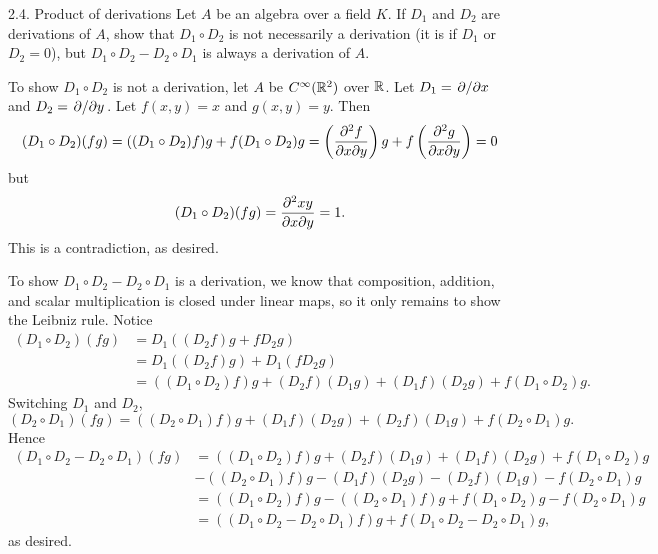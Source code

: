\begin{problem}{2.4. Product of derivations}
    Let $A$ be an algebra over a field $K$. If $D_1$ and $D_2$ are derivations of $A$, show that $D_1 \circ D_2$ is not
necessarily a derivation (it is if $D_1$ or $D_2 = 0$), but $D_1 \circ D_2 - D_2 \circ D_1$ is always a derivation of
$A$.
\end{problem}

To show $D_1 \circ D_2$ is not a derivation, let $A$ be $C^{\infty}(\mathbb{R}^2)$ over $\mathbb{R}$. 
Let $D_1 = \pdv*{x}$ and $D_2 = \pdv*{y}$. Let $f(x, y) = x$ and $g(x, y) = y$. Then
\begin{align}
    (D_1 \circ D_2)(fg) = ((D_1 \circ D_2)f) g + f(D_1 \circ D_2)g = \left(\pdv{f}{x}{y}\right) g + f \left(\pdv{g}{x}{y}\right) = 0
\end{align}
but 
\begin{align}
    (D_1 \circ D_2)(fg) = \pdv{xy}{x}{y} = 1 .
\end{align}
This is a contradiction, as desired.

To show $D_1 \circ D_2 - D_2 \circ D_1$ is a derivation, we know that composition, addition, and scalar multiplication 
is closed under linear maps, so it only remains to show the Leibniz rule. Notice 
\begin{align}
    (D_1 \circ D_2)(fg) &= D_1((D_2f) g + f D_2g) \\ 
    &= D_1 ((D_2f) g) + D_1 (f D_2g ) \\ 
    &= ((D_1 \circ D_2)f) g + (D_2f)(D_1g) + (D_1 f)(D_2g) + f (D_1 \circ D_2)g .
\end{align}
Switching $D_1$ and $D_2$, 
\begin{equation}
    (D_2 \circ D_1)(fg) = ((D_2 \circ D_1)f) g + (D_1f)(D_2g) + (D_2 f)(D_1g) + f (D_2 \circ D_1)g .
\end{equation}
Hence 
\begin{align}
    (D_1 \circ D_2 - D_2 \circ D_1)(fg) &= ((D_1 \circ D_2)f) g + (D_2f)(D_1g) + (D_1 f)(D_2g) + f (D_1 \circ D_2)g \\ 
    &- ((D_2 \circ D_1)f) g - (D_1f)(D_2g) - (D_2 f)(D_1g) - f (D_2 \circ D_1)g  \\ 
    &= ((D_1 \circ D_2)f) g - ((D_2 \circ D_1)f) g + f (D_1 \circ D_2)g - f (D_2 \circ D_1)g \\ 
    &= ((D_1 \circ D_2 - D_2 \circ D_1)f) g + f(D_1 \circ D_2 - D_2 \circ D_1)g, 
\end{align}
as desired.